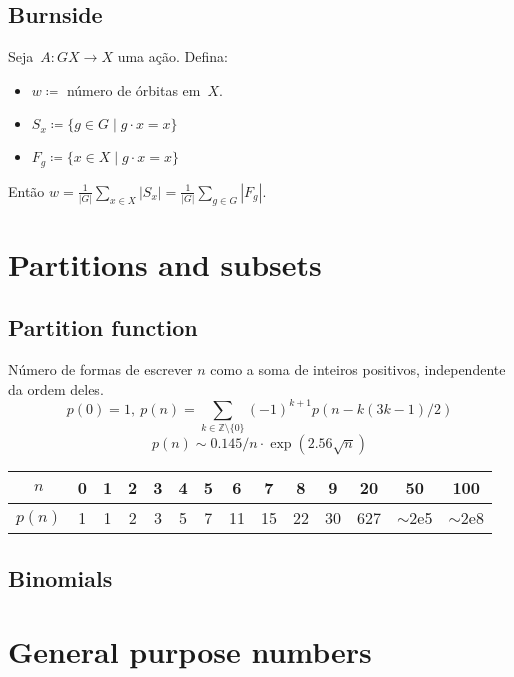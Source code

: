    

	
\subsection{Burnside}
Seja~$A \colon GX \rightarrow X$ uma ação. Defina:
\begin{itemize}
\item $w \coloneqq $ número de órbitas em~$X$.
\item $S_x \coloneqq \{g \in G \mid g \cdot x = x \}$
\item $F_g \coloneqq \{x \in X \mid g \cdot x = x \} $
\end{itemize}
Então $ w = \frac{1}{|G|} \sum\limits_{x \in X}{|S_x|} = \frac{1}{|G|} \sum\limits_{g \in G}{|F_g|}. $

\section{Partitions and subsets}
	\subsection{Partition function}
		Número de formas de escrever $n$ como a soma de inteiros positivos, independente da ordem deles.
		\small
		\[ p(0) = 1,\ p(n) = \sum_{k \in \mathbb Z \setminus \{0\}}{(-1)^{k+1} p(n - k(3k-1) / 2)} \]
		\[ p(n) \sim 0.145 / n \cdot \exp(2.56 \sqrt{n}) \]

		\begin{center}
		\begin{tabular}{c|c@{\ }c@{\ }c@{\ }c@{\ }c@{\ }c@{\ }c@{\ }c@{\ }c@{\ }c@{\ }c@{\ }c@{\ }c}
			$n$    & 0 & 1 & 2 & 3 & 4 & 5 & 6  & 7  & 8  & 9  & 20  & 50  & 100 \\ \hline
			$p(n)$ & 1 & 1 & 2 & 3 & 5 & 7 & 11 & 15 & 22 & 30 & 627 & $\mathtt{\sim}$2e5 & $\mathtt{\sim}$2e8 \\
		\end{tabular}
		\end{center}
		\normalsize
    
    
	\subsection{Binomials}

\section{General purpose numbers}

